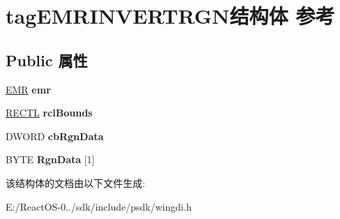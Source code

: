 \hypertarget{structtag_e_m_r_i_n_v_e_r_t_r_g_n}{}\section{tag\+E\+M\+R\+I\+N\+V\+E\+R\+T\+R\+G\+N结构体 参考}
\label{structtag_e_m_r_i_n_v_e_r_t_r_g_n}
\subsection*{Public 属性}
\begin{DoxyCompactItemize}
\item 
\mbox{\label{structtag_e_m_r_i_n_v_e_r_t_r_g_n_af0f120bc2ca7fd979b02d0f024dc5594}} 
\hyperlink{structtag_e_m_r}{E\+MR} {\bfseries emr}
\item 
\mbox{\label{structtag_e_m_r_i_n_v_e_r_t_r_g_n_a340a26d1936f7ef0503e1ee9cf3ed6b2}} 
\hyperlink{struct___r_e_c_t_l}{R\+E\+C\+TL} {\bfseries rcl\+Bounds}
\item 
\mbox{\label{structtag_e_m_r_i_n_v_e_r_t_r_g_n_ada892ac68cdceadf6414d944bcca5628}} 
D\+W\+O\+RD {\bfseries cb\+Rgn\+Data}
\item 
\mbox{\label{structtag_e_m_r_i_n_v_e_r_t_r_g_n_a6828671a5454e830324a04c4fd8da766}} 
B\+Y\+TE {\bfseries Rgn\+Data} \mbox{[}1\mbox{]}
\end{DoxyCompactItemize}


该结构体的文档由以下文件生成\+:\begin{DoxyCompactItemize}
\item 
E\+:/\+React\+O\+S-\/0../sdk/include/psdk/wingdi.\+h\end{DoxyCompactItemize}

